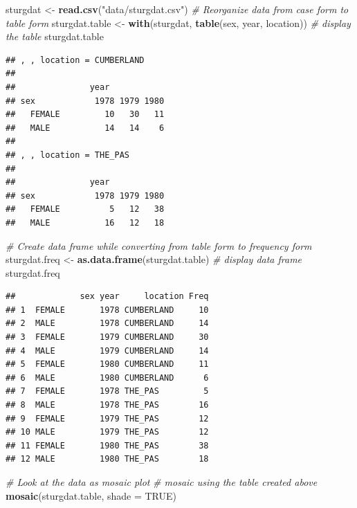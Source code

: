 \documentclass[
  12pt,
]{book}
\newenvironment{Shaded}{\begin{snugshade}}{\end{snugshade}}
\newcommand{\CommentTok}[1]{\textcolor[rgb]{0.56,0.35,0.01}{\textit{#1}}}
\newcommand{\DataTypeTok}[1]{\textcolor[rgb]{0.13,0.29,0.53}{#1}}
\newcommand{\KeywordTok}[1]{\textcolor[rgb]{0.13,0.29,0.53}{\textbf{#1}}}
\newcommand{\NormalTok}[1]{#1}
\newcommand{\OtherTok}[1]{\textcolor[rgb]{0.56,0.35,0.01}{#1}}
\newcommand{\StringTok}[1]{\textcolor[rgb]{0.31,0.60,0.02}{#1}}
\begin{document}
\begin{Shaded}
\begin{Highlighting}[]
\NormalTok{sturgdat \textless{}{-}}\StringTok{ }\KeywordTok{read.csv}\NormalTok{(}\StringTok{"data/sturgdat.csv"}\NormalTok{)}
\CommentTok{\# Reorganize data from case form to table form}
\NormalTok{sturgdat.table \textless{}{-}}\StringTok{ }\KeywordTok{with}\NormalTok{(sturgdat, }\KeywordTok{table}\NormalTok{(sex, year, location))}
\CommentTok{\# display the table}
\NormalTok{sturgdat.table}
\end{Highlighting}
\end{Shaded}

\begin{verbatim}
## , , location = CUMBERLAND  
## 
##               year
## sex            1978 1979 1980
##   FEMALE         10   30   11
##   MALE           14   14    6
## 
## , , location = THE_PAS     
## 
##               year
## sex            1978 1979 1980
##   FEMALE          5   12   38
##   MALE           16   12   18
\end{verbatim}

\begin{Shaded}
\begin{Highlighting}[]
\CommentTok{\# Create data frame while converting from table form to frequency form}
\NormalTok{sturgdat.freq \textless{}{-}}\StringTok{ }\KeywordTok{as.data.frame}\NormalTok{(sturgdat.table)}
\CommentTok{\# display data frame}
\NormalTok{sturgdat.freq}
\end{Highlighting}
\end{Shaded}

\begin{verbatim}
##             sex year     location Freq
## 1  FEMALE       1978 CUMBERLAND     10
## 2  MALE         1978 CUMBERLAND     14
## 3  FEMALE       1979 CUMBERLAND     30
## 4  MALE         1979 CUMBERLAND     14
## 5  FEMALE       1980 CUMBERLAND     11
## 6  MALE         1980 CUMBERLAND      6
## 7  FEMALE       1978 THE_PAS         5
## 8  MALE         1978 THE_PAS        16
## 9  FEMALE       1979 THE_PAS        12
## 10 MALE         1979 THE_PAS        12
## 11 FEMALE       1980 THE_PAS        38
## 12 MALE         1980 THE_PAS        18
\end{verbatim}

\begin{Shaded}
\begin{Highlighting}[]
\CommentTok{\# Look at the data as mosaic plot}
\CommentTok{\# mosaic using the table created above}
\KeywordTok{mosaic}\NormalTok{(sturgdat.table, }\DataTypeTok{shade =} \OtherTok{TRUE}\NormalTok{)}
\end{Highlighting}
\end{Shaded}
\end{document}
